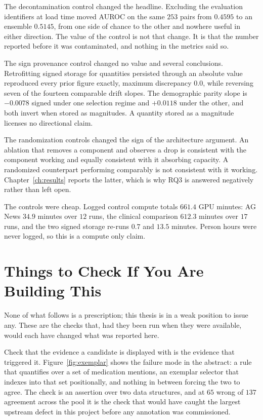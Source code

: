 The decontamination control changed the headline. Excluding the evaluation
identifiers at load time moved AUROC on the same $253$ pairs from $0.4595$ to an
ensemble $0.5145$, from one side of chance to the other and nowhere useful in
either direction. The value of the control is not that change. It is that the
number reported before it was contaminated, and nothing in the metrics said so.

The sign provenance control changed no value and several conclusions.
Retrofitting signed storage for quantities persisted through an absolute value
reproduced every prior figure exactly, maximum discrepancy $0.0$, while
reversing seven of the fourteen comparable drift slopes. The demographic parity
slope is $-0.0078$ signed under one selection regime and $+0.0118$ under the
other, and both invert when stored as magnitudes. A quantity stored as a
magnitude licenses no directional claim.

The randomization controls changed the sign of the architecture argument. An
ablation that removes a component and observes a drop is consistent with the
component working and equally consistent with it absorbing capacity. A
randomized counterpart performing comparably is not consistent with it working.
Chapter~\ref{ch:results} reports the latter, which is why RQ3 is answered
negatively rather than left open.

The controls were cheap. Logged control compute totals $661.4$ GPU minutes: AG
News $34.9$ minutes over $12$ runs, the clinical comparison $612.3$ minutes over
$17$ runs, and the two signed storage re-runs $0.7$ and $13.5$ minutes. Person
hours were never logged, so this is a compute only claim.

\section{Things to Check If You Are Building This}
\label{sec:conc-practice}

None of what follows is a prescription; this thesis is in a weak position to
issue any. These are the checks that, had they been run when they were
available, would each have changed what was reported here.

Check that the evidence a candidate is displayed with is the evidence that
triggered it. Figure~\ref{fig:exemplar} shows the failure mode in the abstract:
a rule that quantifies over a set of medication mentions, an exemplar selector
that indexes into that set positionally, and nothing in between forcing the two
to agree. The check is an assertion over two data structures, and at $65$ wrong of $137$
agreement across the pool it is the check that would have caught the largest
upstream defect in this project before any annotation was commissioned.

